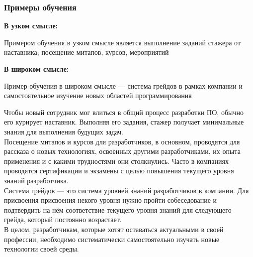 \documentclass{../industrial-development}
\begin{document}
\begin{frame} \frametitle{Примеры обучения}
		\begin{minipage}{0.48\textwidth}
			\textbf{В узком смысле:}
			
				Примером обучения в узком смысле является выполнение заданий стажера от наставника; посещение митапов, курсов, мероприятий
		\end{minipage}
		\hfill
		\begin{minipage}{0.48\textwidth}
			\textbf{В широком смысле:}
			
				Пример обучения в широком смысле --- система грейдов в рамках компании и самостоятельное изучение новых областей программирования
		\end{minipage}
\end{frame}
\lecturenotes
Чтобы новый сотрудник мог влиться в общий процесс разработки ПО, обычно его курирует наставник. Выполняя его задания, стажер получает минимальные знания для выполнения будущих задач.\\
Посещение митапов и курсов для разработчиков, в основном, проводятся для рассказа о новых технологиях, освоенных другими разработчиками, их опыта применения и с какими трудностями они столкнулись. Часто в компаниях проводятся сертификации и экзамены с целью повышения текущего уровня знаний разработчика.\\
Система грейдов --- это система уровней знаний разработчиков в компании. Для присвоения присвоения некого уровня нужно пройти собеседование и подтвердить на нём соответствие текущего уровня знаний для следующего грейда, который постоянно возрастает.\\
В целом, разработчикам, которые хотят оставаться актуальными в своей профессии, необходимо систематически самостоятельно изучать новые технологии своей среды.
\end{document}
